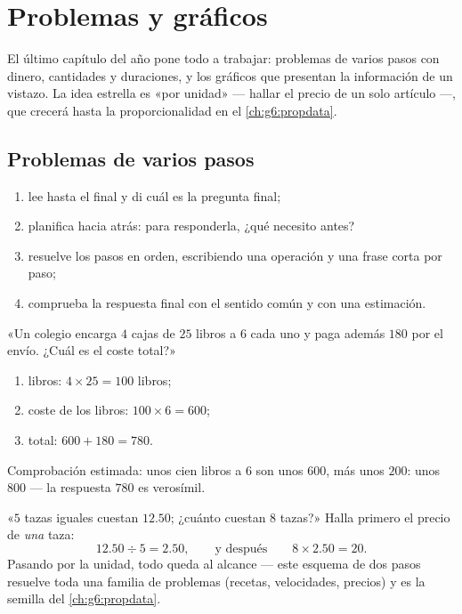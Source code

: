 \chapter{Problemas y gráficos}\label{ch:g5:data}

El último capítulo del año pone todo a trabajar: problemas de varios
pasos con dinero, cantidades y duraciones, y los gráficos que
presentan la información de un vistazo. La idea estrella es «por unidad» ---
hallar el precio de un solo artículo ---, que crecerá hasta la
proporcionalidad en el \cref{ch:g6:propdata}.

\section{Problemas de varios pasos}

\begin{method}\label{met:g5:data:steps}
\begin{enumerate}
  \item lee hasta el final y di cuál es la pregunta final;
  \item planifica hacia atrás: para responderla, ¿qué necesito antes?
  \item resuelve los pasos en orden, escribiendo una operación y una
        frase corta por paso;
  \item comprueba la respuesta final con el sentido común y con una
        estimación.
\end{enumerate}
\end{method}

\begin{example}\label{ex:g5:data:multistep}
«Un colegio encarga $4$ cajas de $25$ libros a $6$ cada uno y paga además
$180$ por el envío. ¿Cuál es el coste total?»
\begin{enumerate}
  \item libros: $4 \times 25 = 100$ libros;
  \item coste de los libros: $100 \times 6 = 600$;
  \item total: $600 + 180 = 780$.
\end{enumerate}
Comprobación estimada: unos cien libros a $6$ son unos $600$, más
unos $200$: unos $800$ --- la respuesta $780$ es verosímil.
\end{example}

\begin{example}\label{ex:g5:data:perone}
«$5$ tazas iguales cuestan $12.50$; ¿cuánto cuestan $8$ tazas?»
Halla primero el precio de \emph{una} taza:
\[
12.50 \div 5 = 2.50,
\qquad\text{y después}\qquad
8 \times 2.50 = 20 .
\]
Pasando por la unidad, todo queda al alcance --- este esquema de dos pasos
resuelve toda una familia de problemas (recetas, velocidades, precios) y es
la semilla del \cref{ch:g6:propdata}.
\end{example}

